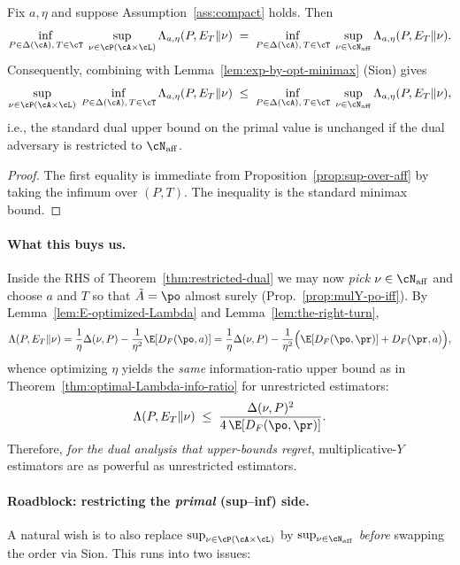 \begin{theorem}\label{thm:restricted-dual}
    Fix $a,\eta$ and suppose Assumption~\ref{ass:compact} holds. Then
    \[
        \inf_{P\in\Delta(\cA),\,T\in\cT}\;\sup_{\nu\in\cP(\cA\times\cL)} \Lambda_{a,\eta}(P,E_T\Vert \nu)
        \;=\;
        \inf_{P\in\Delta(\cA),\,T\in\cT}\;\sup_{\nu\in\cN_{\mathrm{aff}}} \Lambda_{a,\eta}(P,E_T\Vert \nu).
    \]
    Consequently, combining with Lemma~\ref{lem:exp-by-opt-minimax} (Sion) gives
    \[
        \sup_{\nu\in\cP(\cA\times\cL)}\;\inf_{P\in\Delta(\cA),\,T\in\cT} \Lambda_{a,\eta}(P,E_T\Vert \nu)
        \;\le\;
        \inf_{P\in\Delta(\cA),\,T\in\cT}\;\sup_{\nu\in\cN_{\mathrm{aff}}} \Lambda_{a,\eta}(P,E_T\Vert \nu),
    \]
    i.e., the standard dual upper bound on the primal value is unchanged if the dual adversary is restricted to $\cN_{\mathrm{aff}}$.
\end{theorem}

\begin{proof}
    The first equality is immediate from Proposition~\ref{prop:sup-over-aff} by taking the infimum over $(P,T)$. The inequality is the standard minimax bound.
\end{proof}

\paragraph{What this buys us.}
Inside the RHS of Theorem~\ref{thm:restricted-dual} we may now \emph{pick} $\nu\in\cN_{\mathrm{aff}}$ and choose $a$ and $T$ so that $\tilde{A}=\po$ almost surely (Prop.~\ref{prop:mulY-po-iff}).
By Lemma~\ref{lem:E-optimized-Lambda} and Lemma~\ref{lem:the-right-turn},
\[
    \Lambda(P,E_T\Vert \nu)
    =
    \frac{1}{\eta}\Delta(\nu,P)
    -\frac{1}{\eta^2}\E\!\left[D_F(\po,a)\right]
    =
    \frac{1}{\eta}\Delta(\nu,P)
    -\frac{1}{\eta^2}\Big(\E[D_F(\po,\pr)]+D_F(\pr,a)\Big),
\]
whence optimizing $\eta$ yields the \emph{same} information-ratio upper bound
as in Theorem~\ref{thm:optimal-Lambda-info-ratio} for unrestricted estimators:
\[
    \Lambda(P,E_T\Vert \nu)\;\le\;\frac{\Delta(\nu,P)^2}{4\,\E[D_F(\po,\pr)]}.
\]
Therefore, \emph{for the dual analysis that upper-bounds regret}, multiplicative-$Y$ estimators are as powerful as unrestricted estimators.
\medskip

\paragraph{Roadblock: restricting the \emph{primal} (sup--inf) side.}
A natural wish is to also replace $\sup_{\nu\in\cP(\cA\times\cL)}$ by $\sup_{\nu\in\cN_{\mathrm{aff}}}$ \emph{before} swapping the order via Sion. This runs into two issues:

